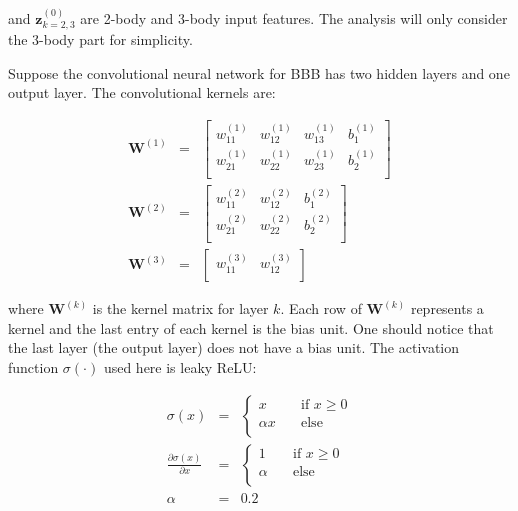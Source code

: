 \documentclass{article}
\begin{document}
\noindent and $\mathbf{z}^{(0)}_{k=2,3}$ are 2-body and 3-body input features. The analysis 
will only consider the 3-body part for simplicity.

Suppose the convolutional neural network for BBB has two hidden layers and one output layer.
The convolutional kernels are:

\begin{eqnarray}
\mathbf{W}^{(1)} & = & \left[\begin{array}{cccc}
	w^{(1)}_{11} & w^{(1)}_{12} & w^{(1)}_{13} & b^{(1)}_{1} \\
	w^{(1)}_{21} & w^{(1)}_{22} & w^{(1)}_{23} & b^{(1)}_{2} \\
\end{array}
\right] \\
\mathbf{W}^{(2)} & = & \left[\begin{array}{ccc}
	w^{(2)}_{11} & w^{(2)}_{12} & b^{(2)}_{1} \\
	w^{(2)}_{21} & w^{(2)}_{22} & b^{(2)}_{2} \\
\end{array}
\right] \\
\mathbf{W}^{(3)} & = & \left[\begin{array}{cc}
	w^{(3)}_{11} & w^{(3)}_{12} \\
\end{array}
\right]
\end{eqnarray}

\noindent where $\mathbf{W}^{(k)}$ is the kernel matrix for layer $k$. Each row of  
$\mathbf{W}^{(k)}$ represents a kernel and the last entry of each kernel is the bias unit. 
One should notice that the last layer (the output layer) does not have a bias unit.
The activation function $\sigma(\cdot)$ used here is leaky ReLU:

\begin{eqnarray}
\sigma(x) & = & \begin{cases}
	x & \quad \text{if } x \geq 0 \\
	\alpha x & \quad \text{else} \\
\end{cases} \\
\frac{\partial{\sigma(x)}}{\partial{x}} & = & \begin{cases}
	1 & \quad \text{if } x \geq 0 \\
	\alpha & \quad \text{else} \\
\end{cases} \\
\alpha & = & 0.2
\end{eqnarray}
\end{document}
